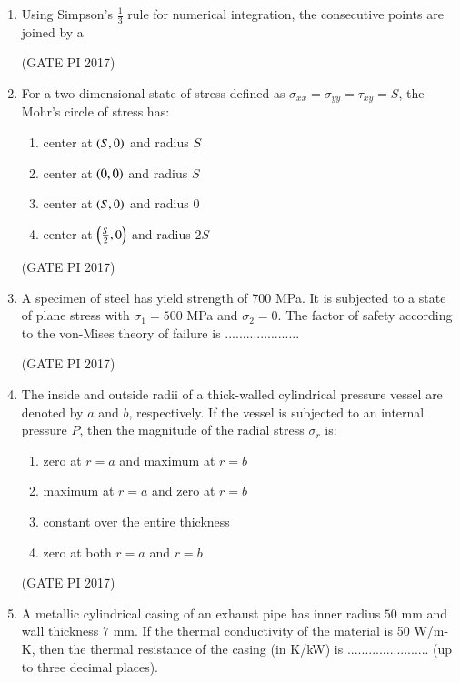 \documentclass[journal,12pt,onecolumn]{IEEEtran}
\theoremstyle{remark}
\begin{document}
\begin{enumerate}
\item Using Simpson's $\frac{1}{3}$ rule for numerical integration, the consecutive points are joined by a
\begin{enumerate}
\end{enumerate}
\hfill (GATE PI 2017)

\item For a two-dimensional state of stress defined as $\sigma_{xx} = \sigma_{yy} = \tau_{xy} = S$, the Mohr's circle of stress has:
\begin{enumerate}
\item center at $\left(S, 0\right)$ and radius $S$
\item center at $\left(0, 0\right)$ and radius $S$
\item center at $\left(S, 0\right)$ and radius $0$
\item center at $\left(\frac{S}{2}, 0\right)$ and radius $2S$
\end{enumerate}
\hfill (GATE PI 2017)

\item A specimen of steel has yield strength of 700 MPa. It is subjected to a state of plane stress with $\sigma_1 = 500$ MPa and $\sigma_2 = 0$. The factor of safety according to the von-Mises theory of failure is .....................

\hfill (GATE PI 2017) 


\item The inside and outside radii of a thick-walled cylindrical pressure vessel are denoted by $a$ and $b$, respectively. If the vessel is subjected to an internal pressure $P$, then the magnitude of the radial stress $\sigma_r$ is:
\begin{enumerate}
\item zero at $r = a$ and maximum at $r = b$
\item maximum at $r = a$ and zero at $r = b$
\item constant over the entire thickness
\item zero at both $r = a$ and $r = b$
\end{enumerate}
\hfill (GATE PI 2017)

\item A metallic cylindrical casing of an exhaust pipe has inner radius $50$ mm and wall thickness $7$ mm. If the thermal conductivity of the material is 50 W/m-K, then the thermal resistance of the casing (in K/kW) is ....................... (up to three decimal places).  


\end{enumerate}
\end{document}
